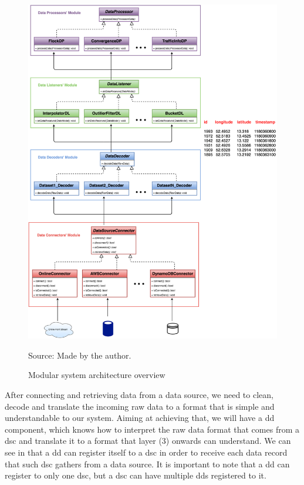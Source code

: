 \begin{figure}[h!]
    \centering
    \caption{Modular system architecture overview}
    \centerline{\includegraphics[width=\linewidth]{images/architecture.eps}}
    \footnotesize{Source: Made by the author.}
    \label{fig:architecture}
\end{figure}

After connecting and retrieving data from a data source, we need to clean, decode and translate the incoming raw data to
a format that is simple and understandable to our system. Aiming at achieving that, we will have a \ac{dd} component,
which knows how to interpret the raw data format that comes from a \ac{dsc} and translate it to a format that layer (3)
onwards can understand. We can see in  that a \ac{dd} can register itself to a \ac{dsc} in
order to receive each data record that such \ac{dsc} gathers from a data source. It is important to note that a \ac{dd}
can register to only one \ac{dsc}, but a \ac{dsc} can have multiple \acp{dd} registered to it.


